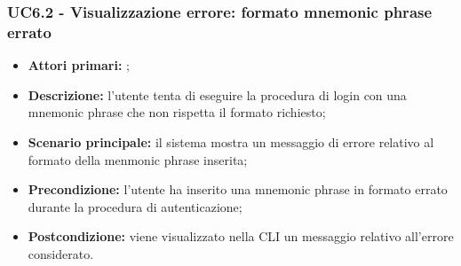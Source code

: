 \subsubsection{UC6.2 - Visualizzazione errore: formato mnemonic phrase errato}
\begin{itemize}
	\item \textbf{Attori primari:} \una{};
	\item \textbf{Descrizione:} l’utente tenta di eseguire la procedura di login con una mnemonic phrase che non rispetta il formato richiesto;  
	\item \textbf{Scenario principale:} il sistema mostra un messaggio di errore relativo al formato della menmonic phrase inserita;
	\item \textbf{Precondizione:} l'utente ha inserito una mnemonic phrase in formato errato durante la procedura di autenticazione; 
	\item \textbf{Postcondizione:} viene visualizzato nella CLI un messaggio relativo all’errore considerato.  
\end{itemize}